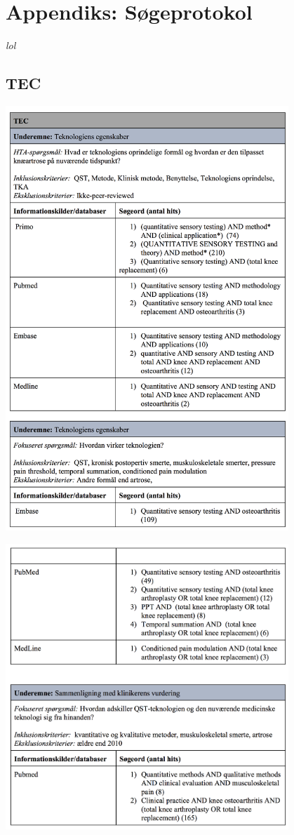 \chapter{Appendiks: Søgeprotokol} \vspace{-.75cm}
\textit{lol}
\section{TEC}\label{TEC_sog}
\includegraphics[width=0.8\textwidth]{rapportAfsnit/qBilag/sogninger/TEC1}

\includegraphics[width=0.8\textwidth]{rapportAfsnit/qBilag/sogninger/TEC2}

